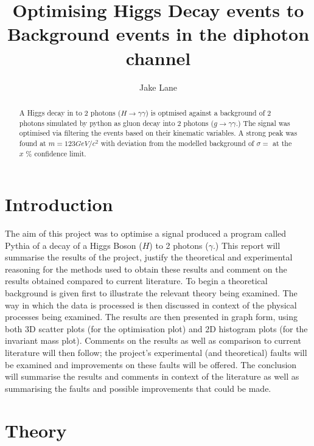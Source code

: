 \documentclass{article}
\author{Jake Lane}
\title{Optimising Higgs Decay events to Background events in the diphoton channel}
\begin{document}
\maketitle
\begin{abstract}
A Higgs decay in to 2 photons ($H \rightarrow \gamma \gamma$) is optmised against a background of 2 photons simulated by python as gluon decay into 2 photons ($g \rightarrow \gamma \gamma$.) The signal was optimised via filtering the events based on their kinematic variables. A strong peak was found at $m = 123 GeV/c^2$ with deviation from the modelled background of $\sigma = $ at the $x$ \% confidence limit.

\end{abstract}
\section{Introduction}
The aim of this project was to optimise a signal produced a program called Pythia of a decay of a Higgs Boson ($H$) to 2 photons ($\gamma$.) This report will summarise the results of the project, justify the theoretical and experimental reasoning for the methods used to obtain these results and comment on the results obtained compared to current literature. \cite{HiggsDetection}
To begin a theoretical background is given first to illustrate the relevant theory being examined. The way in which the data is processed is then discussed in context of the physical processes being examined. The results are then presented in graph form, using both 3D scatter plots (for the optimisation plot) and 2D histogram plots (for the invariant mass plot). Comments on the results as well as comparison to current literature will then follow; the project's experimental (and theoretical) faults will be examined and improvements on these faults will be offered. The conclusion will summarise the results and comments in context of the literature as well as summarising the faults and possible improvements that could be made.  
\section{Theory}
\end{document}
